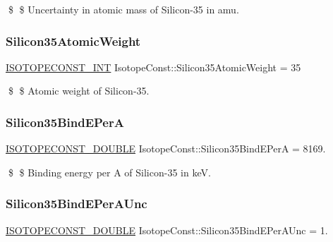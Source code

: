 \$ \$ Uncertainty in atomic mass of Silicon-\/35 in amu. \mbox{\label{group___isotope_const-_silicon-_si35_ga14d52adb3886b351c688e747dc769c01}} 
\subsubsection{\texorpdfstring{Silicon35\+Atomic\+Weight}{Silicon35AtomicWeight}}
{\footnotesize\ttfamily \mbox{\hyperlink{group___isotope_const-_macros_ga5f18360b3e99483a35c32d789e62621c}{I\+S\+O\+T\+O\+P\+E\+C\+O\+N\+S\+T\+\_\+\+I\+NT}} Isotope\+Const\+::\+Silicon35\+Atomic\+Weight = 35}

\$ \$ Atomic weight of Silicon-\/35. \mbox{\label{group___isotope_const-_silicon-_si35_ga6ed48eff49eb772a251471cba1e39a23}} 
\subsubsection{\texorpdfstring{Silicon35\+Bind\+E\+PerA}{Silicon35BindEPerA}}
{\footnotesize\ttfamily \mbox{\hyperlink{group___isotope_const-_macros_ga8f45a7272ce02c0b4c65c44636ed719a}{I\+S\+O\+T\+O\+P\+E\+C\+O\+N\+S\+T\+\_\+\+D\+O\+U\+B\+LE}} Isotope\+Const\+::\+Silicon35\+Bind\+E\+PerA = 8169.}

\$ \$ Binding energy per A of Silicon-\/35 in keV. \mbox{\label{group___isotope_const-_silicon-_si35_ga967e4d268831668e7ba36aeb5ab2a4cf}} 
\subsubsection{\texorpdfstring{Silicon35\+Bind\+E\+Per\+A\+Unc}{Silicon35BindEPerAUnc}}
{\footnotesize\ttfamily \mbox{\hyperlink{group___isotope_const-_macros_ga8f45a7272ce02c0b4c65c44636ed719a}{I\+S\+O\+T\+O\+P\+E\+C\+O\+N\+S\+T\+\_\+\+D\+O\+U\+B\+LE}} Isotope\+Const\+::\+Silicon35\+Bind\+E\+Per\+A\+Unc = 1.}

